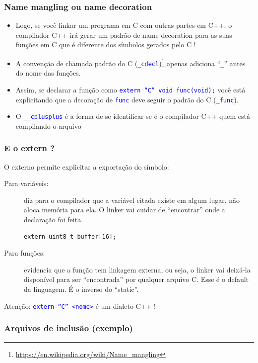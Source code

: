 \documentclass{beamer}
\begin{document}
\begin{frame}[fragile]
	\frametitle{Name mangling ou name decoration}
		\begin{itemize}
			\item Logo, se você linkar um programa em C com outras partes em C++, o compilador C++ irá gerar um padrão de name decoration para as suas funções em C que é diferente dos símbolos gerados pelo C !
           \item A convenção de chamada padrão do C (\texttt{\textcolor{blue}{\_cdecl}})\footnote{\tiny{\url{https://en.wikipedia.org/wiki/Name_mangling}}} apenas adiciona ``\texttt{\textcolor{blue}{\_}}'' antes do nome das funções.
           \item Assim, se declarar a função como \texttt{\textcolor{blue}{extern ``C'' void func(void);}} você está explicitando que a decoração de \texttt{\textcolor{blue}{func}} deve seguir o padrão do C (\texttt{\textcolor{blue}{\_func}}).
           \item O \texttt{\textcolor{blue}{\_\_cplusplus}} é a forma de se identificar se é o compilador C++ quem está compilando o arquivo
		\end{itemize}
\end{frame}

\begin{frame}[fragile]
	\frametitle{E o extern ?}
	O externo permite explicitar a exportação do símbolo:
	\vspace*{0.5cm}
	\begin{description}
	\item [Para variáveis:] diz para o compilador que a variável citada existe em algum lugar, não aloca memória para ela. O linker vai cuidar de ``encontrar'' onde a declaração foi feita.
	\begin{verbatim}
extern uint8_t buffer[16];
	\end{verbatim}
	\item [Para funções:]	evidencia que a função tem linkagem externa, ou seja, o linker vai deixá-la disponível para ser ``encontrada'' por qualquer arquivo C. Esse é o default da linguagem. É o inverso do ``static''.
	\end{description}
		\vspace*{0.5cm}
		\begin{center}
		Atenção: \texttt{\textcolor{blue}{extern ``C'' <nome>}} é um dialeto C++ !
	\end{center}
\end{frame}

\begin{frame}
	\frametitle{Arquivos de inclusão (exemplo)}
	
\end{frame}
\end{document}
